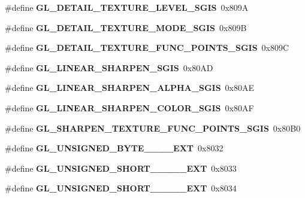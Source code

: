 \begin{DoxyCompactItemize}
\item 
\#define {\bfseries G\+L\+\_\+\+D\+E\+T\+A\+I\+L\+\_\+\+T\+E\+X\+T\+U\+R\+E\+\_\+\+L\+E\+V\+E\+L\+\_\+\+S\+G\+I\+S}~0x809\+A\label{_s_d_l__opengl_8h_ae8d58b5778eaf1643b16ae03db3b38f4}

\item 
\#define {\bfseries G\+L\+\_\+\+D\+E\+T\+A\+I\+L\+\_\+\+T\+E\+X\+T\+U\+R\+E\+\_\+\+M\+O\+D\+E\+\_\+\+S\+G\+I\+S}~0x809\+B\label{_s_d_l__opengl_8h_a33af6435800206a273499f9a23626191}

\item 
\#define {\bfseries G\+L\+\_\+\+D\+E\+T\+A\+I\+L\+\_\+\+T\+E\+X\+T\+U\+R\+E\+\_\+\+F\+U\+N\+C\+\_\+\+P\+O\+I\+N\+T\+S\+\_\+\+S\+G\+I\+S}~0x809\+C\label{_s_d_l__opengl_8h_a78f576460462f7fb616cd0ae0585ee5d}

\item 
\#define {\bfseries G\+L\+\_\+\+L\+I\+N\+E\+A\+R\+\_\+\+S\+H\+A\+R\+P\+E\+N\+\_\+\+S\+G\+I\+S}~0x80\+A\+D\label{_s_d_l__opengl_8h_a511a227d3c7699c49fa89c2d1fa63df2}

\item 
\#define {\bfseries G\+L\+\_\+\+L\+I\+N\+E\+A\+R\+\_\+\+S\+H\+A\+R\+P\+E\+N\+\_\+\+A\+L\+P\+H\+A\+\_\+\+S\+G\+I\+S}~0x80\+A\+E\label{_s_d_l__opengl_8h_a30dbfbe35451a5fcc12b42bf3744ec16}

\item 
\#define {\bfseries G\+L\+\_\+\+L\+I\+N\+E\+A\+R\+\_\+\+S\+H\+A\+R\+P\+E\+N\+\_\+\+C\+O\+L\+O\+R\+\_\+\+S\+G\+I\+S}~0x80\+A\+F\label{_s_d_l__opengl_8h_aa5eece901dbd542481f21fdf265b5fab}

\item 
\#define {\bfseries G\+L\+\_\+\+S\+H\+A\+R\+P\+E\+N\+\_\+\+T\+E\+X\+T\+U\+R\+E\+\_\+\+F\+U\+N\+C\+\_\+\+P\+O\+I\+N\+T\+S\+\_\+\+S\+G\+I\+S}~0x80\+B0\label{_s_d_l__opengl_8h_a4f75ce1659760bd5587366ebaed5c0f4}

\item 
\#define {\bfseries G\+L\+\_\+\+U\+N\+S\+I\+G\+N\+E\+D\+\_\+\+B\+Y\+T\+E\+\_\+\_\+\_\+\_\+\+E\+X\+T}~0x8032\label{_s_d_l__opengl_8h_a398dcdd0ef8494d181a8636a4b32357b}

\item 
\#define {\bfseries G\+L\+\_\+\+U\+N\+S\+I\+G\+N\+E\+D\+\_\+\+S\+H\+O\+R\+T\+\_\+\_\+\_\+\_\+\_\+\+E\+X\+T}~0x8033\label{_s_d_l__opengl_8h_aea6b5bd47d55702e4822a64ec5b97b21}

\item 
\#define {\bfseries G\+L\+\_\+\+U\+N\+S\+I\+G\+N\+E\+D\+\_\+\+S\+H\+O\+R\+T\+\_\+\_\+\_\+\_\+\_\+\+E\+X\+T}~0x8034\label{_s_d_l__opengl_8h_a4989dac57f34fc13065b9bf155103ffb}


\end{DoxyCompactItemize}

